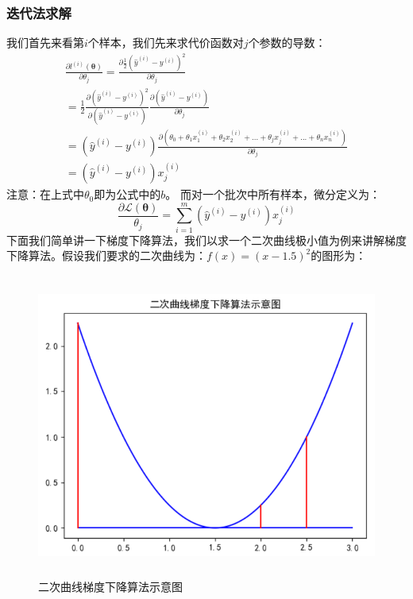 \documentclass[UTF8]{article}
\begin{document}
\subsubsection{迭代法求解}
我们首先来看第$i$个样本，我们先来求代价函数对$j$个参数的导数：
\begin{equation}
\begin{aligned}
\frac{ \partial{ l^{(i)}(\boldsymbol{\theta}) } }{ \partial{\theta _{j}} } = \frac{ \partial{ \frac{1}{2} (\hat{y}^{(i)} - y^{(i)})^{2} } }{ \partial{\theta _{j}} } \\
= \frac{1}{2} \frac{ \partial{ (\hat{y}^{(i)} - y^{(i)})^{2} } } { \partial{ (\hat{y}^{(i)} - y^{(i)}) } } \frac{{ \partial{ (\hat{y}^{(i)} - y^{(i)}) } }} { \partial{\theta _{j}} } \\
= (\hat{y}^{(i)} - y^{(i)}) \frac{ \partial{ (\theta _{0} + \theta _{1}x_{1}^{(i)} + \theta _{2}x_{2}^{(i)} + ... + \theta _{j}x_{j}^{(i)} + ... + \theta _{n}x_{n}^{(i)}  ) } }{ \partial{\theta _{j}} } \\
= (\hat{y}^{(i)} - y^{(i)})x_{j}^{(i)}
\end{aligned}
\label{lrrn-loss-gradient-samplei-thetaj}
\end{equation}
注意：在上式中$\theta _{0}$即为公式中的$b$。
而对一个批次中所有样本，微分定义为：
\begin{equation}
\frac{\partial{\mathcal{L}(\boldsymbol{\theta})}}{\theta _{j}} = \sum_{i=1}^{m} (\hat{y}^{(i)} - y^{(i)})x_{j}^{(i)}
\label{lrrn-loss-gradient-batch-theta-i}
\end{equation}
下面我们简单讲一下梯度下降算法，我们以求一个二次曲线极小值为例来讲解梯度下降算法。假设我们要求的二次曲线为：$f(x)=(x-1.5)^{2}$的图形为：
\begin{figure}[H]
	\caption{二次曲线梯度下降算法示意图}
	\label{f000014}
	\centering
	\includegraphics[height=10cm]{images/f000014}
\end{figure}
\end{document}
